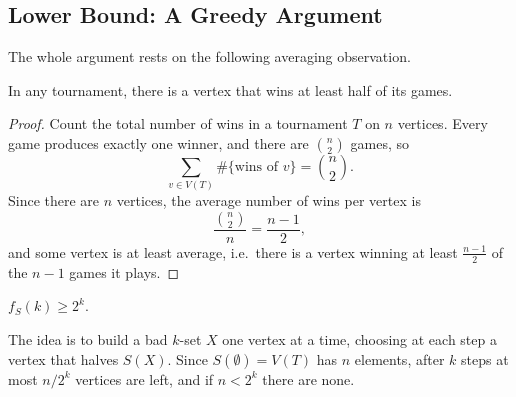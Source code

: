 \subsection{Lower Bound: A Greedy Argument}

The whole argument rests on the following averaging observation.

\begin{lemma}\label{lem:half-wins}
    In any tournament, there is a vertex that wins at least half of its games.
\end{lemma}

\begin{proof}
    Count the total number of wins in a tournament \(T\) on \(n\) vertices. Every game produces exactly one winner, and there are \(\binom{n}{2}\) games, so
    \[
        \sum_{v \in V(T)} \#\{\text{wins of } v\} = \binom{n}{2}.
    \]
    Since there are \(n\) vertices, the average number of wins per vertex is
    \[
        \frac{\binom{n}{2}}{n} = \frac{n-1}{2},
    \]
    and some vertex is at least average, i.e.\ there is a vertex winning at least \(\frac{n-1}{2}\) of the \(n - 1\) games it plays.
\end{proof}

\begin{proposition}\label{prop:fs-lower}
    \(f_S(k) \ge 2^k\).
\end{proposition}

The idea is to build a bad \(k\)-set \(X\) one vertex at a time, choosing at each step a vertex that halves \(S(X)\). Since \(S(\emptyset) = V(T)\) has \(n\) elements, after \(k\) steps at most \(n/2^k\) vertices are left, and if \(n < 2^k\) there are none.
\begin{center}
\end{center}

